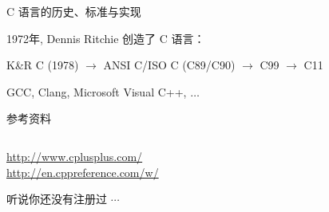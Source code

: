 \begin{frame}{C 语言的历史、标准与实现}
  \centerline{1972年, Dennis Ritchie 创造了 C 语言：}

  \vspace{0.50cm}
  \centerline{K\&R C (1978) $\to$ ANSI C/ISO C (C89/C90) $\to$ C99 $\to$ C11}

  \vspace{0.30cm}
  \centerline{GCC, Clang, Microsoft Visual C++, $\ldots$}
\end{frame}

\begin{frame}{参考资料}
  \begin{columns}
  \end{columns}

  \vspace{0.20cm}
  \pause
  \begin{center}
    \url{http://www.cplusplus.com/}\\[8pt]
    \url{http://en.cppreference.com/w/}
  \end{center}
\end{frame}

\begin{frame}{听说你还没有注册过 $\cdots$}
\end{frame}

